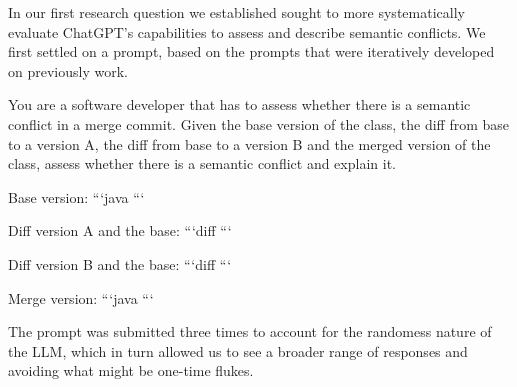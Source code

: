 In our first research question we established sought to more systematically evaluate ChatGPT's capabilities to assess and describe semantic conflicts.
We first settled on a prompt, based on the prompts that were iteratively developed on previously work.

\begin{prompt}
You are a software developer that has to assess whether there is a semantic conflict in a merge commit.  Given the base version of the class, the diff from base to a version A, the diff from base to a version B and the merged version of the class, assess whether there is a semantic conflict and explain it.

Base version:
```java
```

Diff version A and the base:
```diff
```

Diff version B and the base:
```diff
```

Merge version:
```java
```
\end{prompt}

The prompt was submitted three times to account for the randomess nature of the
LLM, which in turn allowed us to see a broader range of responses and avoiding
what might be one-time flukes.

